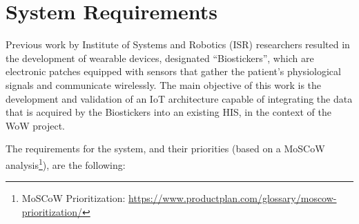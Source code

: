 
\section{System Requirements}

Previous work by Institute of Systems and Robotics (ISR) researchers resulted in the development of wearable devices, designated ``Biostickers'', which are electronic patches equipped with sensors that gather the patient's physiological signals and communicate wirelessly. 
The main objective of this work is the development and validation of an \acs{IoT} architecture capable of integrating the data that is acquired by the Biostickers into an existing \acs{HIS}, in the context of the \acs{WoW} project. 

The requirements for the system, and their priorities (based on a MoSCoW analysis\footnote{MoSCoW Prioritization: \url{https://www.productplan.com/glossary/moscow-prioritization/}}), are the following: 





